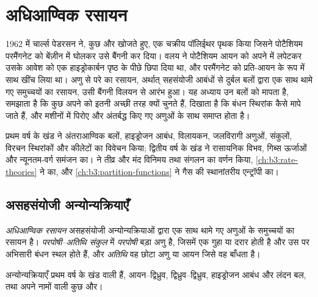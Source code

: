 \chapter{अधिआण्विक रसायन}\label{ch:b3:supramolecular}

1962 में चार्ल्स पेडरसन ने, कुछ और खोजते हुए, एक चक्रीय
पॉलिईथर पृथक किया जिसने पोटैशियम परमैंगनेट को बेंज़ीन में घोलकर उसे
बैंगनी कर दिया। वलय ने पोटैशियम आयन को अपने में लपेटकर उसके
आवेश को एक हाइड्रोकार्बन पृष्ठ के पीछे छिपा दिया था, और परमैंगनेट को प्रति-आयन के रूप में
साथ खींच लिया था। अणु से परे का रसायन, अर्थात् सहसंयोजी आबंधों से दुर्बल बलों द्वारा
एक साथ थामे गए समुच्चयों का रसायन, उसी बैंगनी विलयन से आरंभ हुआ।
यह अध्याय उन बलों को मापता है, समझाता है कि कुछ  अपने  को
इतनी अच्छी तरह क्यों चुनते हैं, दिखाता है कि बंधन स्थिरांक कैसे मापे जाते हैं, और
मशीनों में पिरोए और अंतर्बद्ध किए गए अणुओं के साथ समाप्त होता है।

\begin{recall}
प्रथम वर्ष के खंड ने अंतराआण्विक बलों, हाइड्रोजन आबंध, विलायकन,
जलविरागी अणुओं, संकुलों, विरचन स्थिरांकों और कीलेटों का विवेचन किया; द्वितीय वर्ष के
खंड ने रासायनिक विभव, गिब्स ऊर्जाओं और न्यूनतम-वर्ग समंजन का।
 ने तीव्र और मंद विनिमय तथा संगलन का वर्णन किया,
\cref{ch:b3:rate-theories} ने  का, और
\cref{ch:b3:partition-functions} ने गैस की स्थानांतरीय एन्ट्रॉपी का।
\end{recall}

\section{असहसंयोजी अन्योन्यक्रियाएँ}

\begin{definition}[अधिआण्विक रसायन]\label{def:b3:supramolecular:supramolecular}
\emph{अधिआण्विक रसायन} असहसंयोजी अन्योन्यक्रियाओं द्वारा
एक साथ थामे गए अणुओं के समुच्चयों का रसायन है।
\emph{परपोषी--अतिथि संकुल} में \emph{परपोषी}
बड़ा अणु है, जिसमें एक गुहा या दरार होती है और उस पर अभिसारी बंधन स्थल होते हैं,
और \emph{अतिथि} वह छोटा अणु या आयन जिसे वह बाँधता है।
\end{definition}

अन्योन्यक्रियाएँ प्रथम वर्ष के खंड वाली हैं, आयन--द्विध्रुव, द्विध्रुव--द्विध्रुव,
हाइड्रोजन आबंध और लंदन बल, तथा अपने नामों वाली कुछ और।

